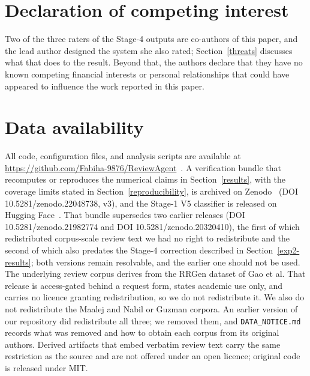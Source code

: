 \documentclass[preprint,12pt]{elsarticle}
\begin{document}
\section*{Declaration of competing interest}
Two of the three raters of the Stage-4 outputs are co-authors of this paper, and the lead author
designed the system she also rated; Section~\ref{threats} discusses what that does to the result.
Beyond that, the authors declare that they have no known competing financial interests or personal
relationships that could have appeared to influence the work reported in this paper.

\section*{Data availability}
All code, configuration files, and analysis scripts are available at
\url{https://github.com/Fabiha-9876/ReviewAgent}~\cite{jalal2026issuespeccode}.
A verification bundle that recomputes or reproduces the numerical claims in
Section~\ref{results}, with the coverage limits stated in Section~\ref{reproducibility}, is archived on Zenodo~\cite{jalal2026issuespecdata}
(DOI 10.5281/zenodo.22048738, v3), and the Stage-1 V5 classifier is released on Hugging Face~\cite{jalal2026issuespecmodel}.
That bundle supersedes two earlier releases (DOI 10.5281/zenodo.21982774 and DOI 10.5281/zenodo.20320410), the first of which redistributed corpus-scale review text we had no right to redistribute and the second of which also predates the
Stage-4 correction described in Section~\ref{exp2-results}; both versions remain resolvable, and
the earlier one should not be used.
The underlying review corpus derives from the RRGen dataset of Gao et al. That release is
access-gated behind a request form, states academic use only, and carries no licence granting
redistribution, so we do not redistribute it. We also do not redistribute the Maalej and Nabil or
Guzman corpora. An earlier version of our repository did redistribute all three; we removed them,
and \texttt{DATA\_NOTICE.md} records what was removed and how to obtain each corpus from its
original authors. Derived artifacts that embed verbatim review text carry the same restriction as
the source and are not offered under an open licence; original code is released under MIT.
\end{document}
